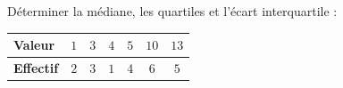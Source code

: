 \begin{exo}
	Déterminer la médiane, les quartiles et l'écart interquartile :

	\begin{center}
		\def\arraystretch{1.4}
		\begin{tabular}{|l|*{6}{c|}} \hline
			\textbf{Valeur}   & $1$ & $3$ & $4$ & $5$ & $10$ & $13$ \\ \hline
			\textbf{Effectif} & $2$ & $3$ & $1$ & $4$ & $6$  & $5$  \\ \hline
		\end{tabular}
	\end{center}
\end{exo}

